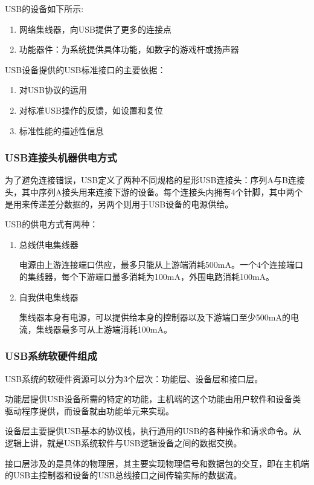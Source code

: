 
USB的设备如下所示: 
\begin{enumerate}
\item 网络集线器，向USB提供了更多的连接点

\item 功能器件：为系统提供具体功能，如数字的游戏杆或扬声器
\end{enumerate}

USB设备提供的USB标准接口的主要依据：     
\begin{enumerate}
\item 对USB协议的运用

\item 对标准USB操作的反馈，如设置和复位

\item 标准性能的描述性信息 
\end{enumerate}

\subsubsection{USB连接头机器供电方式}
为了避免连接错误，USB定义了两种不同规格的星形USB连接头：序列A与B连接头，其中序列A接头用来连接下游的设备。每个连接头内拥有4个针脚，其中两个是用来传递差分数据的，另两个则用于USB设备的电源供给。 

USB的供电方式有两种： 
\begin{enumerate}
\item 总线供电集线器 

电源由上游连接端口供应，最多只能从上游端消耗500mA。一个4个连接端口的集线器，每个下游端口最多消耗为100mA，外围电路消耗100mA。 
\item 自我供电集线器 

集线器本身有电源，可以提供给本身的控制器以及下游端口至少500mA的电流，集线器最多可从上游端消耗100mA。 
\end{enumerate}
\subsubsection{USB系统软硬件组成}
USB系统的软硬件资源可以分为3个层次：功能层、设备层和接口层。 

功能层提供USB设备所需的特定的功能，主机端的这个功能由用户软件和设备类驱动程序提供，而设备就由功能单元来实现。 

设备层主要提供USB基本的协议栈，执行通用的USB的各种操作和请求命令。从逻辑上讲，就是USB系统软件与USB逻辑设备之间的数据交换。 

接口层涉及的是具体的物理层，其主要实现物理信号和数据包的交互，即在主机端的USB主控制器和设备的USB总线接口之间传输实际的数据流。 

